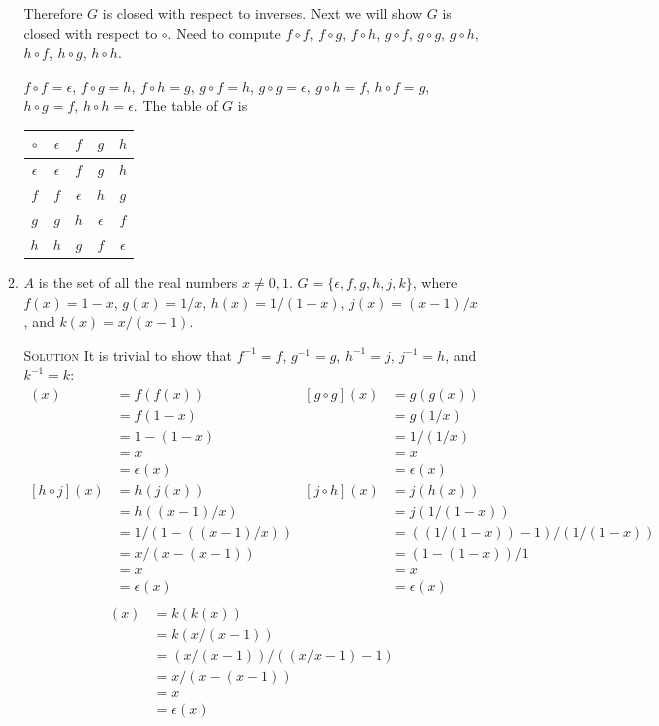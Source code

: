 \documentclass[twoside]{amsart}
\newcommand{\solution}{\textsc{Solution}\xspace}
\begin{document}
\begin{enumerate}[A.]
\begin{enumerate}[1]
      Therefore $G$ is closed with respect to inverses. Next we will show $G$
      is closed with respect to $\circ$. Need to compute $f \circ f$, $f \circ
      g$, $f \circ h$, $g \circ f$, $g \circ g$, $g \circ h$, $h \circ f$, $h
      \circ g$, $h \circ h$.

      $f \circ f = \epsilon$, $f \circ g = h$, $f \circ h = g$, 
      $g \circ f = h$, $g \circ g = \epsilon$, $g \circ h = f$,
      $h \circ f = g$, $h \circ g = f$, $h \circ h = \epsilon$. The
      table of $G$ is
      \begin{center}
      \begin{tabular}{c|cccc}
        $\circ$ & $\epsilon$ & $f$ & $g$ & $h$ \\ \hline
      $\epsilon$& $\epsilon$ & $f$ & $g$ & $h$ \\
            $f$ & $f$ & $\epsilon$ & $h$ & $g$ \\
	    $g$ & $g$ & $h$ & $\epsilon$ & $f$ \\
	    $h$ & $h$ & $g$ & $f$ & $\epsilon$
      \end{tabular}
      \end{center}

      \item $A$ is the set of all the real numbers $x \ne 0,1$. $G =
      \{\epsilon, f, g, h, j, k \}$, where $f(x)=1-x$, $g(x)=1/x$,
      $h(x)=1/(1-x)$, $j(x)=(x-1)/x$, and $k(x)=x/(x-1)$.

      \solution It is trivial to show that $f^{-1}=f$, $g^{-1}=g$,
      $h^{-1}=j$, $j^{-1}=h$, and $k^{-1}=k$:
      \begin{align*}
         [f \circ f](x) &= f(f(x))  & [g \circ g](x) &= g(g(x)) \\
	           &= f(1-x)        &                &= g(1/x) \\
		   &= 1 - (1-x)     &                &= 1/(1/x) \\
		   &= x             &                &= x\\
		   &= \epsilon(x)   &                &= \epsilon(x)  \\
         [h \circ j](x) &= h(j(x))  & [j \circ h](x) &= j(h(x)) \\
	           &= h((x-1)/x)    &                &= j(1/(1-x)) \\
		   &= 1/(1-((x-1)/x)) &             &= ((1/(1-x))-1)/(1/(1-x))\\
		   &= x/(x-(x-1))   &                &= (1-(1-x))/1\\
		   &= x             &                &= x\\
		   &= \epsilon(x)   &                &= \epsilon(x) \\
      \end{align*}
      \begin{align*}
         [k \circ k](x) &= k(k(x)) \\
	           &= k(x/(x-1))   \\
		   &= (x/(x-1))/((x/x-1)-1) \\
		   &= x/(x-(x-1)) \\
		   &= x \\
		   &= \epsilon(x)
      \end{align*}


\end{enumerate}
\end{enumerate}
\end{document}
